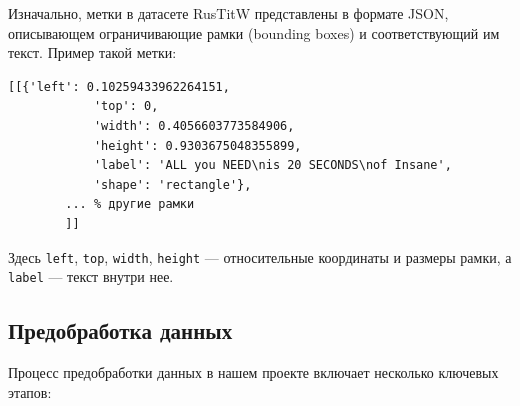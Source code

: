 \documentclass[12pt, a4paper]{article}
\theoremstyle{definition}
\theoremstyle{remark}
\begin{document}
	Изначально, метки в датасете RusTitW представлены в формате JSON, описывающем ограничивающие рамки (bounding boxes) и соответствующий им текст. Пример такой метки:
	\begin{lstlisting}[basicstyle=\small\ttfamily\linespread{0.9}, numbers=none, frame=none, aboveskip=1ex, belowskip=1ex]
		[[{'left': 0.10259433962264151,
			'top': 0,
			'width': 0.4056603773584906,
			'height': 0.9303675048355899,
			'label': 'ALL you NEED\nis 20 SECONDS\nof Insane',
			'shape': 'rectangle'},
		... % другие рамки
		]]
	\end{lstlisting}
	Здесь \texttt{left}, \texttt{top}, \texttt{width}, \texttt{height} — относительные координаты и размеры рамки, а \texttt{label} — текст внутри нее.
	
	\subsection{Предобработка данных}
	Процесс предобработки данных в нашем проекте включает несколько ключевых этапов:
\end{document}
